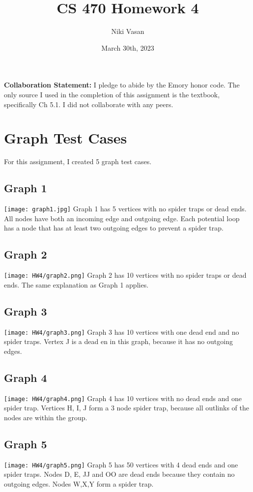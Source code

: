 \documentclass{article}
\title{CS 470 Homework 4}
\author{Niki Vasan}
\date{March 30th, 2023}
\begin{document}
\maketitle

\textbf{Collaboration Statement:} I pledge to abide by the Emory honor code. The only source I used in the completion of this assignment is the textbook, specifically Ch 5.1. I did not collaborate with any peers.


\section{Graph Test Cases} 
For this assignment, I created 5 graph test cases. 
\subsection{Graph 1}
\texttt{[image: graph1.jpg]}
\newline
Graph 1 has 5 vertices with no spider traps or dead ends. All nodes have both an incoming edge and outgoing edge. Each potential loop has a node that has at least two outgoing edges to prevent a spider trap.
\subsection{Graph 2}
\texttt{[image: HW4/graph2.png]}
\newline
Graph 2 has 10 vertices with no spider traps or dead ends. The same explanation as Graph 1 applies. 
\subsection{Graph 3}
\texttt{[image: HW4/graph3.png]}
\newline
Graph 3 has 10 vertices with one dead end and no spider traps. Vertex J is a dead en in this graph, because it has no outgoing edges. 

\subsection{Graph 4}
\texttt{[image: HW4/graph4.png]}
\newline
Graph 4 has 10 vertices with no dead ends and one spider trap. Vertices H, I, J form a 3 node spider trap, because all outlinks of the nodes are within the group. 

\subsection{Graph 5}
\texttt{[image: HW4/graph5.png]}
\newline
Graph 5 has 50 vertices with 4 dead ends and one spider traps. Nodes D, E, JJ and OO are dead ends because they contain no outgoing edges. Nodes W,X,Y form a spider trap.
\end{document}
